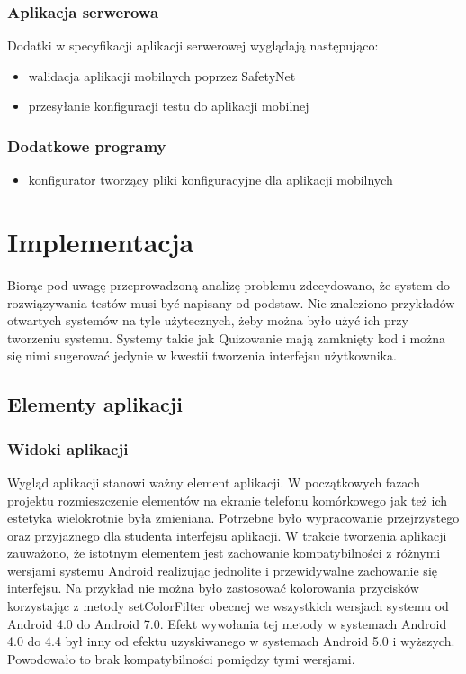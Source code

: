 \documentclass[eng]{mgr}
\begin{document}
			\subsection{Aplikacja serwerowa}
			Dodatki w specyfikacji aplikacji serwerowej wyglądają następująco:
			\begin{itemize}
				\item walidacja aplikacji mobilnych poprzez SafetyNet
				\item przesyłanie konfiguracji testu do aplikacji mobilnej
			\end{itemize}
		
			\subsection{Dodatkowe programy}
			\begin{itemize}
				\item konfigurator tworzący pliki konfiguracyjne dla aplikacji mobilnych
			\end{itemize}
	
	\chapter{Implementacja}
	
	Biorąc pod uwagę przeprowadzoną analizę problemu zdecydowano, że system do rozwiązywania testów musi być napisany od podstaw. Nie znaleziono przykładów otwartych systemów na tyle użytecznych, żeby można było użyć ich przy tworzeniu systemu. Systemy takie jak Quizowanie mają zamknięty kod i można się nimi sugerować jedynie w kwestii tworzenia interfejsu użytkownika.
	
		\section{Elementy aplikacji}
	
			\subsection{Widoki aplikacji}
		
			Wygląd aplikacji stanowi ważny element aplikacji. W początkowych fazach projektu rozmieszczenie elementów na ekranie telefonu komórkowego jak też ich estetyka wielokrotnie była zmieniana. Potrzebne było wypracowanie przejrzystego oraz przyjaznego dla studenta interfejsu aplikacji. W trakcie tworzenia aplikacji zauważono, że istotnym elementem jest zachowanie kompatybilności z różnymi wersjami systemu Android realizując jednolite i przewidywalne zachowanie się interfejsu.
			Na przykład nie można było zastosować kolorowania przycisków korzystając z metody setColorFilter obecnej we wszystkich wersjach systemu od Android 4.0 do Android 7.0. Efekt wywołania tej metody w systemach Android 4.0 do 4.4 był inny od efektu uzyskiwanego w systemach Android 5.0 i wyższych. Powodowało to brak kompatybilności pomiędzy tymi wersjami.\\
		
\end{document}
